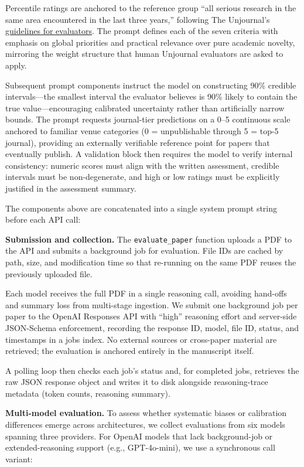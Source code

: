 \documentclass[
  11pt,
  letterpaper,
]{article}
\begin{document}
Percentile ratings are anchored to the reference group ``all serious
research in the same area encountered in the last three years,''
following The Unjournal's
\href{https://globalimpact.gitbook.io/the-unjournal-project-and-communication-space/policies-projects-evaluation-workflow/evaluation/guidelines-for-evaluators}{guidelines
for evaluators}. The prompt defines each of the seven criteria with
emphasis on global priorities and practical relevance over pure academic
novelty, mirroring the weight structure that human Unjournal evaluators
are asked to apply.

Subsequent prompt components instruct the model on constructing 90\%
credible intervals---the smallest interval the evaluator believes is
90\% likely to contain the true value---encouraging calibrated
uncertainty rather than artificially narrow bounds. The prompt requests
journal-tier predictions on a 0--5 continuous scale anchored to familiar
venue categories (0 = unpublishable through 5 = top-5 journal),
providing an externally verifiable reference point for papers that
eventually publish. A validation block then requires the model to verify
internal consistency: numeric scores must align with the written
assessment, credible intervals must be non-degenerate, and high or low
ratings must be explicitly justified in the assessment summary.

The components above are concatenated into a single system prompt string
before each API call:

\textbf{Submission and collection.} The \texttt{evaluate\_paper}
function uploads a PDF to the API and submits a background job for
evaluation. File IDs are cached by path, size, and modification time so
that re-running on the same PDF reuses the previously uploaded file.

Each model receives the full PDF in a single reasoning call, avoiding
hand-offs and summary loss from multi-stage ingestion. We submit one
background job per paper to the OpenAI Responses API with ``high''
reasoning effort and server-side JSON-Schema enforcement, recording the
response ID, model, file ID, status, and timestamps in a jobs index. No
external sources or cross-paper material are retrieved; the evaluation
is anchored entirely in the manuscript itself.

A polling loop then checks each job's status and, for completed jobs,
retrieves the raw JSON response object and writes it to disk alongside
reasoning-trace metadata (token counts, reasoning summary).

\textbf{Multi-model evaluation.} To assess whether systematic biases or
calibration differences emerge across architectures, we collect
evaluations from six models spanning three providers. For OpenAI models
that lack background-job or extended-reasoning support (e.g.,
GPT-4o-mini), we use a synchronous call variant:
\end{document}
